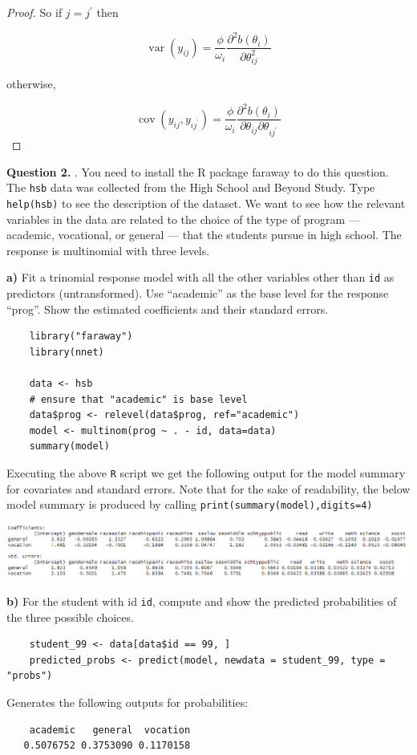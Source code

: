 \documentclass{article}
\newcommand\questionbox[1]{%
  \begin{Qbox}#1\end{Qbox}}
\begin{document}
\begin{proof}
So if $j=j^{\prime}$ then

$$
\operatorname{var}\left(y_{i j}\right)=\frac{\phi}{\omega_{i}} \frac{\partial^{2} b\left(\theta_{i}\right)}{\partial \theta_{i j}^{2}}
$$

otherwise,

$$
\operatorname{cov}\left(y_{i j}, y_{i j^{\prime}}\right)=\frac{\phi}{\omega_{i}} \frac{\partial^{2} b\left(\theta_{i}\right)}{\partial \theta_{i j} \partial \theta_{i j^{\prime}}}
$$
\end{proof}

\newpage
\questionbox{\textbf{Question 2.} . You need to install the R package faraway to do this question. The \texttt{hsb} data was collected from the High
School and Beyond Study. Type \texttt{help(hsb)} to see the description of the dataset. We want to see how the
relevant variables in the data are related to the choice of the type of program — academic, vocational, or
general — that the students pursue in high school. The response is multinomial with three levels.
}
\questionbox{\textbf{a)} Fit a trinomial response model with all the other variables other than \texttt{id} as predictors (untransformed). Use “academic” as the base level for the response “prog”. Show the estimated coefficients
and their standard errors.
}

\begin{verbatim}
    library("faraway")
    library(nnet)
    
    data <- hsb
    # ensure that "academic" is base level
    data$prog <- relevel(data$prog, ref="academic")
    model <- multinom(prog ~ . - id, data=data)
    summary(model)
\end{verbatim}
Executing the above \texttt{R} script we get the following output for the model summary for covariates and standard errors. Note that for the sake of readability, the below model summary is produced by calling \texttt{print(summary(model),digits=4)}
\begin{center}
    \includegraphics[scale=0.5]{glm-notes/imgs/modelOutput2.PNG}
\end{center}

\questionbox{\textbf{b)} For the student with id \texttt{id}, compute and show the predicted probabilities of the three possible choices.
}
\begin{verbatim}
    student_99 <- data[data$id == 99, ]
    predicted_probs <- predict(model, newdata = student_99, type = "probs")
\end{verbatim}
Generates the following outputs for probabilities:
\begin{verbatim}
    academic   general  vocation 
   0.5076752 0.3753090 0.1170158 
\end{verbatim}
\end{document}
